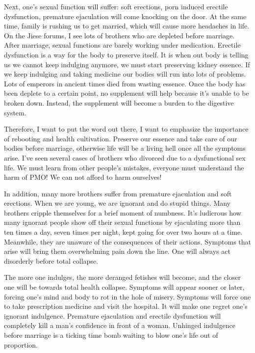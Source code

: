 \documentclass[
]{book}
\begin{document}
Next, one's sexual function will suffer: soft erections, porn induced erectile dysfunction, premature ejaculation will come knocking on the door. At the same time, family is rushing us to get married, which will cause more headaches in life. On the Jiese forums, I see lots of brothers who are depleted before marriage. After marriage, sexual functions are barely working under medication. Erectile dysfunction is a way for the body to preserve itself. It is when out body is telling us we cannot keep indulging anymore, we must start preserving kidney essence. If we keep indulging and taking medicine our bodies will run into lots of problems. Lots of emperors in ancient times died from wasting essence. Once the body has been deplete to a certain point, no supplement will help because it's unable to be broken down. Instead, the supplement will become a burden to the digestive system.

Therefore, I want to put the word out there, I want to emphasize the importance of rebooting and health cultivation. Preserve our essence and take care of our bodies before marriage, otherwise life will be a living hell once all the symptoms arise. I've seen several cases of brothers who divorced due to a dysfunctional sex life. We must learn from other people's mistakes, everyone must understand the harm of PMO! We can not afford to harm ourselves!

In addition, many more brothers suffer from premature ejaculation and soft erections. When we are young, we are ignorant and do stupid things. Many brothers cripple themselves for a brief moment of numbness. It's ludicrous how many ignorant people show off their sexual functions by ejaculating more than ten times a day, seven times per night, kept going for over two hours at a time. Meanwhile, they are unaware of the consequences of their actions. Symptoms that arise will bring them overwhelming pain down the line. One will always act disorderly before total collapse.

The more one indulges, the more deranged fetishes will become, and the closer one will be towards total health collapse. Symptoms will appear sooner or later, forcing one's mind and body to rot in the hole of misery. Symptoms will force one to take prescription medicine and visit the hospital. It will make one regret one's ignorant indulgence. Premature ejaculation and erectile dysfunction will completely kill a man's confidence in front of a woman. Unhinged indulgence before marriage is a ticking time bomb waiting to blow one's life out of proportion.
\end{document}
